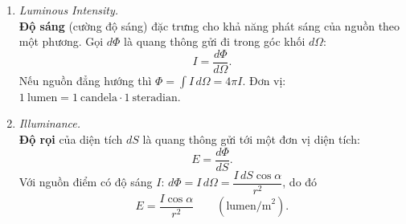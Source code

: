 \begin{enumerate}
\item \textit{Luminous Intensity.}\\
\textbf{Độ sáng} (cường độ sáng) đặc trưng cho khả năng phát sáng của nguồn theo một phương. Gọi $d\Phi$ là quang thông gửi đi trong góc khối $d\Omega$:
\[
I = \frac{d\Phi}{d\Omega}.
\]
Nếu nguồn đẳng hướng thì $\Phi = \int I\,d\Omega = 4\pi I$. Đơn vị: $1\ \text{lumen} = 1\ \text{candela} \cdot 1\ \text{steradian}$.

\item \textit{Illuminance.}\\
\textbf{Độ rọi} của diện tích $dS$ là quang thông gửi tới một đơn vị diện tích:
\[
E = \frac{d\Phi}{dS}.
\]
Với nguồn điểm có độ sáng $I$: $d\Phi = I\,d\Omega = \dfrac{I\,dS\cos\alpha}{r^2}$, do đó
\[
E = \frac{I\cos\alpha}{r^2} \qquad (\text{lumen/m}^2).
\]
\end{enumerate}

